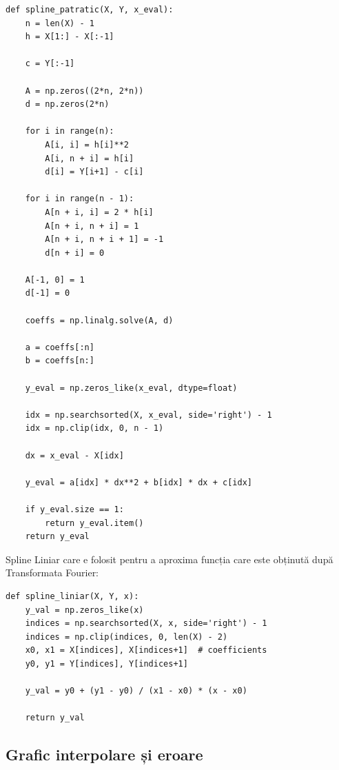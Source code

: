 \documentclass[12pt]{article}
\begin{document}
\begin{lstlisting}
def spline_patratic(X, Y, x_eval):    
    n = len(X) - 1
    h = X[1:] - X[:-1]
    
    c = Y[:-1]
    
    A = np.zeros((2*n, 2*n))
    d = np.zeros(2*n)
    
    for i in range(n):
        A[i, i] = h[i]**2      
        A[i, n + i] = h[i]      
        d[i] = Y[i+1] - c[i]    
    
    for i in range(n - 1):
        A[n + i, i] = 2 * h[i]      
        A[n + i, n + i] = 1          
        A[n + i, n + i + 1] = -1     
        d[n + i] = 0
    
    A[-1, 0] = 1
    d[-1] = 0
    
    coeffs = np.linalg.solve(A, d)
    
    a = coeffs[:n]
    b = coeffs[n:]
    
    y_eval = np.zeros_like(x_eval, dtype=float)
    
    idx = np.searchsorted(X, x_eval, side='right') - 1
    idx = np.clip(idx, 0, n - 1)
    
    dx = x_eval - X[idx]
    
    y_eval = a[idx] * dx**2 + b[idx] * dx + c[idx]
    
    if y_eval.size == 1:
        return y_eval.item()
    return y_eval
\end{lstlisting}

Spline Liniar care e folosit pentru a aproxima funcția care este obținută după Transformata Fourier:

\begin{lstlisting}
def spline_liniar(X, Y, x):
    y_val = np.zeros_like(x)
    indices = np.searchsorted(X, x, side='right') - 1
    indices = np.clip(indices, 0, len(X) - 2)
    x0, x1 = X[indices], X[indices+1]  # coefficients
    y0, y1 = Y[indices], Y[indices+1]
    
    y_val = y0 + (y1 - y0) / (x1 - x0) * (x - x0)

    return y_val
\end{lstlisting}

\subsection{Grafic interpolare și eroare}
\end{document}

